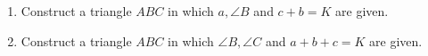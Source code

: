 \begin{enumerate}[label=\thechapter.\arabic*,ref=\thechapter.\theenumi]
\item 
	Construct a triangle $ABC$ in which $a, \angle{B}$ and $c + b  = K$ are given.
\label{cons/tri/1}
	\\
	\solution 

%
\iffalse
\item 
\label{cons/tri/2}

%
\item 
\label{cons/tri/3}

%
\item 
\label{cons/tri/5}

\fi
%
\item Construct a triangle $ABC$ in which $\angle{B}, \angle{C}$ and  $a+b+c=K$ are given.
\label{cons/tri/4}
\\
\solution



\end{enumerate}
